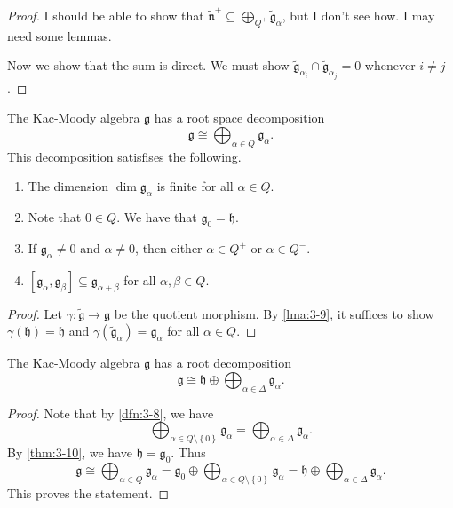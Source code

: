 \documentclass[11pt, letterpaper]{article}
\theoremstyle{plain}
\begin{document}
\begin{proof}
	I should be able to show that $\widetilde{\mathfrak{n} } ^+ \subseteq \bigoplus_{Q^+} \widetilde{\mathfrak{g} }_\alpha $, but I don't see how. I may need some lemmas.

	Now we show that the sum is direct. We must show $\widetilde{\mathfrak{g} }_{\alpha_i} \cap \widetilde{\mathfrak{g} }_{\alpha _j} =0$ whenever $i\neq j$.
\end{proof}



\begin{theorem}\label{thm:3-10}
	The Kac-Moody algebra $\mathfrak{g} $ has a root space decomposition
	\[
		\mathfrak{g} \cong \bigoplus_{\alpha \in Q} \mathfrak{g} _{\alpha } 
	.\]
	This decomposition satisfises the following.
	\begin{enumerate}[align=right, label=(\arabic*)]
		\item The dimension $\dim \mathfrak{g} _{\alpha } $ is finite for all $\alpha \in Q$.
		\item Note that $0\in Q$. We have that $\mathfrak{g} _0=\mathfrak{h} $.
		\item If $\mathfrak{g} _\alpha \neq 0$ and $\alpha \neq 0$, then either $\alpha \in Q^+$ or $\alpha \in Q^-$.
		\item $[\mathfrak{g} _\alpha ,\mathfrak{g} _\beta ]\subseteq \mathfrak{g} _{\alpha +\beta } $ for all $\alpha ,\beta \in Q$.
	\end{enumerate}
\end{theorem}
\begin{proof}
	Let $\gamma : \widetilde{\mathfrak{g} }  \to \mathfrak{g} $ be the quotient morphism. By \cref{lma:3-9}, it suffices to show $\gamma (\mathfrak{h} )=\mathfrak{h} $ and $\gamma (\widetilde{\mathfrak{g} } _\alpha )=\mathfrak{g} _\alpha $ for all $\alpha \in Q$.
\end{proof}

\begin{corollary}\label{cor:3-11}
	The Kac-Moody algebra $\mathfrak{g} $ has a root decomposition
	\[
		\mathfrak{g} \cong \mathfrak{h} \oplus \bigoplus_{\alpha \in \Delta } \mathfrak{g} _\alpha 
	.\]
\end{corollary}
\begin{proof}
	Note that by \cref{dfn:3-8}, we have
	\[
		\bigoplus_{\alpha \in Q\setminus \left\{ 0 \right\} } \mathfrak{g} _{\alpha } =\bigoplus_{\alpha \in \Delta } \mathfrak{g} _{\alpha } 
	.\]
	By \cref{thm:3-10}, we have $\mathfrak{h} =\mathfrak{g} _0$. Thus
	\[
		\mathfrak{g} \cong \bigoplus_{\alpha \in Q} \mathfrak{g} _{\alpha } =\mathfrak{g} _0 \oplus \bigoplus_{\alpha \in Q\setminus \left\{ 0 \right\} } \mathfrak{g} _{\alpha } =\mathfrak{h} \oplus \bigoplus_{\alpha \in \Delta } \mathfrak{g} _{\alpha } 
	.\]
	This proves the statement.
\end{proof}
\end{document}
